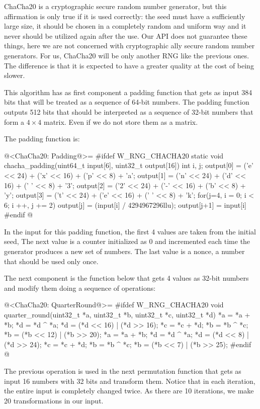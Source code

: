 
ChaCha20 is a cryptographic secure random number generator, but
this affirmation is only true if it is used correctly: the seed must
have a sufficiently large size, it should be chosen in a completely
random and uniform way and it never should be utilized again after
the use. Our API does not guarantee these things, here we are not
concerned with cryptographic ally secure random number generators. For
us, ChaCha20 will be only another RNG like the previous ones. The
difference is that it is expected to have a greater quality at the
cost of being slower.

This algorithm has as first component a padding function that gets as
input 384 bits that will be treated as a sequence of 64-bit
numbers. The padding function outputs 512 bits that should be
interpreted as a sequence of 32-bit numbers that form a $4\times 4$
matrix. Even if we do not store them as a matrix.

The padding function is:

@<ChaCha20: Padding@>=
#ifdef W_RNG_CHACHA20
static void chacha_padding(uint64_t input[6], uint32_t output[16]){
  int i, j;
  output[0] = ('e' << 24) + ('x' << 16) + ('p' << 8) + 'a';
  output[1] = ('n' << 24) + ('d' << 16) + (' ' << 8) + '3';
  output[2] = ('2' << 24) + ('-' << 16) + ('b' << 8) + 'y';
  output[3] = ('t' << 24) + ('e' << 16) + (' ' << 8) + 'k';
  for(j=4, i = 0; i < 6; i ++, j += 2){
    output[j] = (input[i] / 4294967296llu);
    output[j+1] = input[i] %
  }
}
#endif
@

In the input for this padding function, the first 4 values are taken
from the initial seed, The next value is a counter initialized as 0
and incremented each time the generator produces a new set of
numbers. The last value is a nonce, a number that should be used only
once.

The next component is the function below that gets 4 values as 32-bit
numbers and modify them doing a sequence of operations:

@<ChaCha20: QuarterRound@>=
#ifdef W_RNG_CHACHA20
void quarter_round(uint32_t *a, uint32_t *b, uint32_t *c, uint32_t *d){
  *a = *a + *b;
  *d = *d ^ *a;
  *d = (*d << 16) | (*d >> 16);
  *c = *c + *d;
  *b = *b ^ *c;
  *b = (*b << 12) | (*b >> 20);
  *a = *a + *b;
  *d = *d ^ *a;
  *d = (*d << 8) | (*d >> 24);
  *c = *c + *d;
  *b = *b ^ *c;
  *b = (*b << 7) | (*b >> 25);
}
#endif
@

The previous operation is used in the next permutation function that
gets as input 16 numbers with 32 bits and transform them. Notice that
in each iteration, the entire input is completely changed twice. As
there are 10 iterations, we make 20 transformations in our input.

